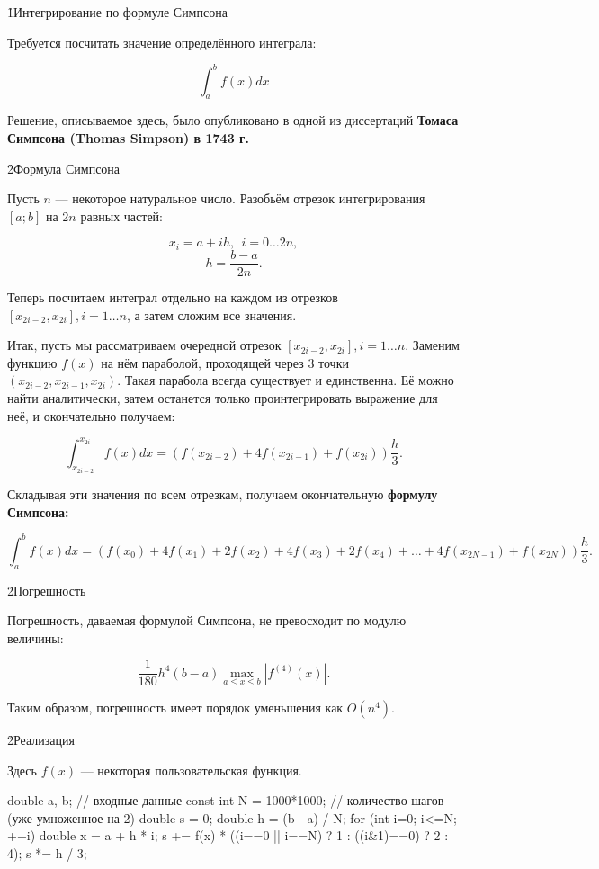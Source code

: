 \h1{Интегрирование по формуле Симпсона}

Требуется посчитать значение определённого интеграла:

$$ \int_a^b f(x) dx $$

Решение, описываемое здесь, было опубликовано в одной из диссертаций \bf{Томаса Симпсона} (Thomas Simpson) в 1743 г.


\h2{Формула Симпсона}

Пусть $n$ --- некоторое натуральное число. Разобьём отрезок интегрирования $[a;b]$ на $2n$ равных частей:

$$ x_i = a + i h,~~i = 0 \ldots 2n, $$
$$ h = \frac{ b-a }{ 2n }. $$

Теперь посчитаем интеграл отдельно на каждом из отрезков $[x_{2i-2}, x_{2i}], i = 1 \ldots n$, а затем сложим все значения.

Итак, пусть мы рассматриваем очередной отрезок $[x_{2i-2}, x_{2i}], i = 1 \ldots n$. Заменим функцию $f(x)$ на нём параболой, проходящей через 3 точки $(x_{2i-2},x_{2i-1},x_{2i})$. Такая парабола всегда существует и единственна. Её можно найти аналитически, затем останется только проинтегрировать выражение для неё, и окончательно получаем:

$$ \int_{x_{2i-2}}^{x_{2i}} f(x) dx = \left( f(x_{2i-2}) + 4 f(x_{2i-1}) + f(x_{2i}) \right) \frac{ h }{ 3 }. $$

Складывая эти значения по всем отрезкам, получаем окончательную \bf{формулу Симпсона}:

$$ \int_a^b f(x) dx = \left( f(x_0) + 4 f(x_1) + 2 f(x_2) + 4 f(x_3) + 2 f(x_4) + \ldots + 4 f(x_{2N-1}) + f(x_{2N}) \right) \frac{ h }{ 3 }. $$


\h2{Погрешность}

Погрешность, даваемая формулой Симпсона, не превосходит по модулю величины:

$$ \frac{ 1 }{ 180 } h^4 (b - a) \max_{a \le x \le b} \left| f^{(4)}(x) \right|. $$

Таким образом, погрешность имеет порядок уменьшения как $O (n^4)$.


\h2{Реализация}

Здесь $f(x)$ --- некоторая пользовательская функция.

\code
double a, b; // входные данные
const int N = 1000*1000; // количество шагов (уже умноженное на 2)
double s = 0;
double h = (b - a) / N;
for (int i=0; i<=N; ++i) {
	double x = a + h * i;
	s += f(x) * ((i==0 || i==N) ? 1 : ((i&1)==0) ? 2 : 4);
}
s *= h / 3;
\endcode